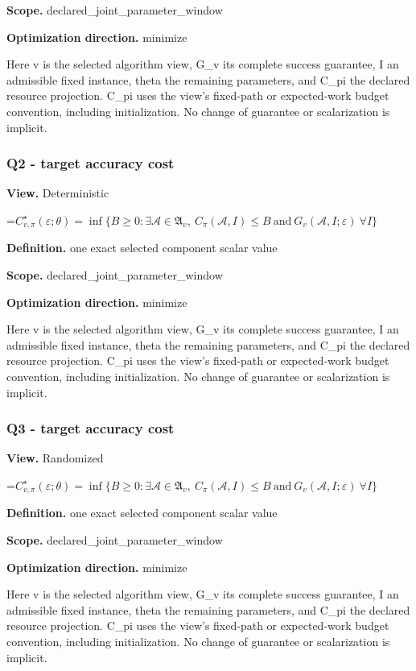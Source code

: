 \documentclass[10pt,a4paper]{article}
\newcommand{\AtlasMath}[1]{\par\begingroup\centering\setbox0=\hbox{$\displaystyle #1$}\ifdim\wd0>1.4\linewidth\typeout{ATLAS WIDE FORMULA: \the\wd0}\fi\ifdim\wd0>\linewidth\resizebox{\linewidth}{!}{\box0}\else\box0\fi\par\endgroup}
\begin{document}
\textbf{Scope.} declared\_joint\_parameter\_window

\textbf{Optimization direction.} minimize

Here v is the selected algorithm view, G\_v its complete success guarantee, I an admissible fixed instance, theta the remaining parameters, and C\_pi the declared resource projection. C\_pi uses the view's fixed-path or expected-work budget convention, including initialization. No change of guarantee or scalarization is implicit.

\subsubsection{Q2 - target accuracy cost}
\textbf{View.} Deterministic

\AtlasMath{C^\star_{v,\pi}(\varepsilon;\theta)=\inf\{B\ge0:\exists\mathcal A\in\mathfrak A_v,\ C_\pi(\mathcal A,I)\le B\ \text{and}\ G_v(\mathcal A,I;\varepsilon)\ \forall I\}}
\textbf{Definition.} one exact selected component scalar value

\textbf{Scope.} declared\_joint\_parameter\_window

\textbf{Optimization direction.} minimize

Here v is the selected algorithm view, G\_v its complete success guarantee, I an admissible fixed instance, theta the remaining parameters, and C\_pi the declared resource projection. C\_pi uses the view's fixed-path or expected-work budget convention, including initialization. No change of guarantee or scalarization is implicit.

\subsubsection{Q3 - target accuracy cost}
\textbf{View.} Randomized

\AtlasMath{C^\star_{v,\pi}(\varepsilon;\theta)=\inf\{B\ge0:\exists\mathcal A\in\mathfrak A_v,\ C_\pi(\mathcal A,I)\le B\ \text{and}\ G_v(\mathcal A,I;\varepsilon)\ \forall I\}}
\textbf{Definition.} one exact selected component scalar value

\textbf{Scope.} declared\_joint\_parameter\_window

\textbf{Optimization direction.} minimize

Here v is the selected algorithm view, G\_v its complete success guarantee, I an admissible fixed instance, theta the remaining parameters, and C\_pi the declared resource projection. C\_pi uses the view's fixed-path or expected-work budget convention, including initialization. No change of guarantee or scalarization is implicit.
\end{document}
